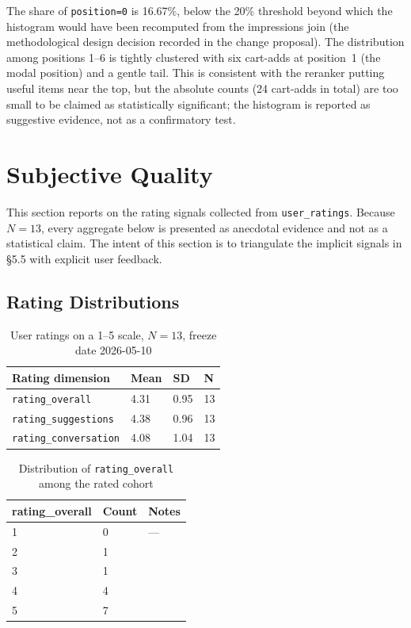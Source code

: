 The share of \texttt{position=0} is 16.67\%, below the 20\% threshold beyond which the histogram would have been recomputed from the impressions join (the methodological design decision recorded in the change proposal). The distribution among positions 1--6 is tightly clustered with six cart-adds at position~1 (the modal position) and a gentle tail. This is consistent with the reranker putting useful items near the top, but the absolute counts (24 cart-adds in total) are too small to be claimed as statistically significant; the histogram is reported as suggestive evidence, not as a confirmatory test.


\section{Subjective Quality}
\label{sec:subjective_quality}

This section reports on the rating signals collected from \texttt{user\_ratings}. Because $N = 13$, every aggregate below is presented as anecdotal evidence and not as a statistical claim. The intent of this section is to triangulate the implicit signals in §5.5 with explicit user feedback.

\subsection{Rating Distributions}
\label{subsec:rating_distributions}

\begin{table}[H]
\centering
\begin{tabular}{p{4cm}p{2cm}p{2cm}p{4cm}}
\toprule
\textbf{Rating dimension} & \textbf{Mean} & \textbf{SD} & \textbf{N}\\
\midrule
\texttt{rating\_overall}        & 4.31 & 0.95 & 13\\
\texttt{rating\_suggestions}    & 4.38 & 0.96 & 13\\
\texttt{rating\_conversation}   & 4.08 & 1.04 & 13\\
\bottomrule
\end{tabular}
\caption{User ratings on a 1--5 scale, $N=13$, freeze date 2026-05-10}
\label{tab:rating_distributions}
\end{table}

\begin{table}[H]
\centering
\begin{tabular}{p{3cm}p{2cm}p{6cm}}
\toprule
\textbf{rating\_overall} & \textbf{Count} & \textbf{Notes}\\
\midrule
1 & 0 & ---\\
2 & 1 & \\
3 & 1 & \\
4 & 4 & \\
5 & 7 & \\
\bottomrule
\end{tabular}
\caption{Distribution of \texttt{rating\_overall} among the rated cohort}
\label{tab:rating_overall_distribution}
\end{table}

